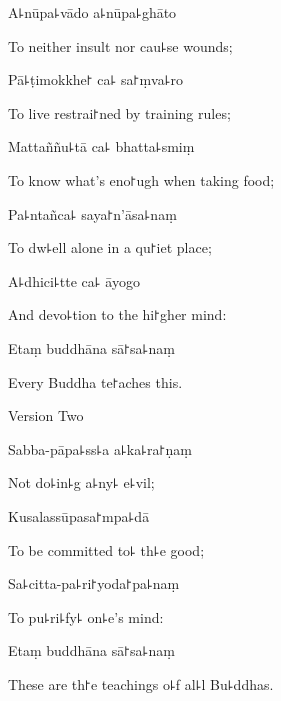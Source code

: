 A꜕nūpa꜕vādo a꜕nūpa꜕ghāto

\begin{english}
  To neither insult nor cau꜕se wounds;
\end{english}

Pā꜕ṭimokkhe꜓ ca꜕ sa꜓ṃva꜕ro

\begin{english}
  To live restrai꜓ned by training rules;
\end{english}

Mattaññu꜕tā ca꜕ bhatta꜕smiṃ

\begin{english}
  To know what's eno꜓ugh when taking food;
\end{english}

Pa꜕ntañca꜕ saya꜓n'āsa꜕naṃ

\begin{english}
  To dw꜕ell alone in a qu꜓iet place;
\end{english}

A꜕dhici꜕tte ca꜕ āyogo

\begin{english}
  And devo꜕tion to the hi꜓gher mind:
\end{english}

Etaṃ buddhāna sā꜓sa꜕naṃ

\begin{english}
  Every Buddha te꜓aches this.
\end{english}

\clearpage

\begin{instruction}
  Version Two
\end{instruction}

Sabba-pāpa꜕ss꜕a a꜕ka꜕ra꜓ṇaṃ

\begin{english}
  Not do꜕in꜕g a꜕ny꜕ e꜕vil;
\end{english}

Kusalassūpasa꜓mpa꜕dā

\begin{english}
  To be committed to꜕ th꜕e good;
\end{english}

Sa꜕citta-pa꜕ri꜓yoda꜓pa꜕naṃ

\begin{english}
  To pu꜕ri꜕fy꜕ on꜕e's mind:
\end{english}

Etaṃ buddhāna sā꜓sa꜕naṃ

\begin{english}
  These are th꜓e teachings o꜕f al꜕l Bu꜕ddhas.
\end{english}

